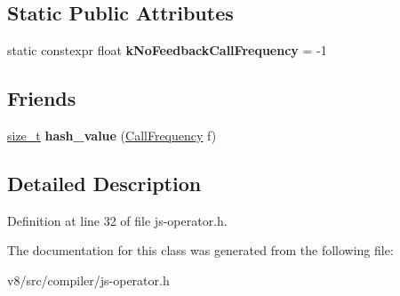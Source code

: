 \subsection*{Static Public Attributes}
\begin{DoxyCompactItemize}
\item 
\mbox{\label{classv8_1_1internal_1_1compiler_1_1CallFrequency_af59252b0706555b84395dc70f85a9aff}} 
static constexpr float {\bfseries k\+No\+Feedback\+Call\+Frequency} = -\/1
\end{DoxyCompactItemize}
\subsection*{Friends}
\begin{DoxyCompactItemize}
\item 
\mbox{\label{classv8_1_1internal_1_1compiler_1_1CallFrequency_a66342ffbd3401f3e4ba4abb595615d26}} 
\mbox{\hyperlink{classsize__t}{size\+\_\+t}} {\bfseries hash\+\_\+value} (\mbox{\hyperlink{classv8_1_1internal_1_1compiler_1_1CallFrequency}{Call\+Frequency}} f)
\end{DoxyCompactItemize}


\subsection{Detailed Description}


Definition at line 32 of file js-\/operator.\+h.



The documentation for this class was generated from the following file\+:\begin{DoxyCompactItemize}
\item 
v8/src/compiler/js-\/operator.\+h\end{DoxyCompactItemize}
